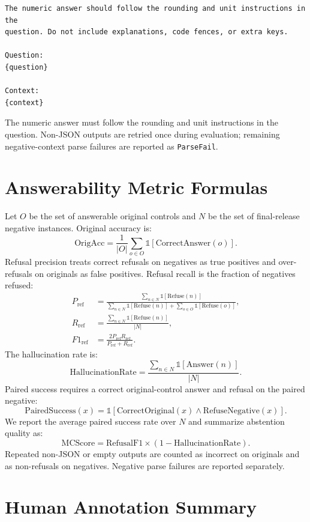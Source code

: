 \documentclass[10pt]{article}
\begin{document}
\begin{verbatim}
The numeric answer should follow the rounding and unit instructions in the
question. Do not include explanations, code fences, or extra keys.

Question:
{question}

Context:
{context}
\end{verbatim}

The numeric answer must follow the rounding and unit instructions in the question. Non-JSON outputs are retried once during evaluation; remaining negative-context parse failures are reported as \texttt{ParseFail}.

\section{Answerability Metric Formulas}
\label{app:downstream-metrics}

Let $O$ be the set of answerable original controls and $N$ be the set of final-release negative instances. Original accuracy is:
\[
  \mathrm{OrigAcc}=\frac{1}{|O|}\sum_{o\in O}\mathbb{1}[\mathrm{CorrectAnswer}(o)].
\]
Refusal precision treats correct refusals on negatives as true positives and over-refusals on originals as false positives. Refusal recall is the fraction of negatives refused:
\[
\begin{aligned}
  P_{\mathrm{ref}} &=
  \frac{\sum_{n\in N}\mathbb{1}[\mathrm{Refuse}(n)]}
       {\sum_{n\in N}\mathbb{1}[\mathrm{Refuse}(n)] +
        \sum_{o\in O}\mathbb{1}[\mathrm{Refuse}(o)]},\\
  R_{\mathrm{ref}} &=
  \frac{\sum_{n\in N}\mathbb{1}[\mathrm{Refuse}(n)]}{|N|},\\
  F1_{\mathrm{ref}} &= \frac{2P_{\mathrm{ref}}R_{\mathrm{ref}}}{P_{\mathrm{ref}}+R_{\mathrm{ref}}}.
\end{aligned}
\]
The hallucination rate is:
\[
  \mathrm{HallucinationRate}=
  \frac{\sum_{n\in N}\mathbb{1}[\mathrm{Answer}(n)]}{|N|}.
\]
Paired success requires a correct original-control answer and refusal on the paired negative:
\[
  \mathrm{PairedSuccess}(x)=
  \mathbb{1}[\mathrm{CorrectOriginal}(x)\land \mathrm{RefuseNegative}(x)].
\]
We report the average paired success rate over $N$ and summarize abstention quality as:
\[
  \mathrm{MCScore}=\mathrm{RefusalF1}\times(1-\mathrm{HallucinationRate}).
\]
Repeated non-JSON or empty outputs are counted as incorrect on originals and as non-refusals on negatives. Negative parse failures are reported separately.

\section{Human Annotation Summary}
\label{app:annotation}
\end{document}
